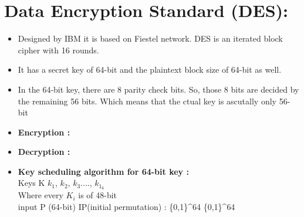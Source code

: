 \documentclass[11pt]{article}
\begin{document}
\section{Data Encryption Standard (DES):}
\begin{itemize}
\item Designed by IBM it is based on Fiestel network. DES is an iterated block cipher with 16 rounds. 
\item It has a secret key of 64-bit and the plaintext block size of 64-bit as well.
\item In the 64-bit key, there are 8 parity check bits. So, those 8 bits are decided by the remaining 56 bits. Which means that the ctual key is ascutally only 56-bit
\item \textbf{Encryption :} \\





\item \textbf{Decryption :} \\

\item \textbf{Key scheduling algorithm for 64-bit key : } \\

Keys K \rightarrow $k_1$, $k_2$, $k_3$...., $k_1_6$ \\

Where every $K_i$ is of 48-bit \\

input P (64-bit) \quad IP(initial permutation) : \{0,1\}^{64} \rightarrow \{0,1\}^{64} \\



\end{itemize}
\end{document}
